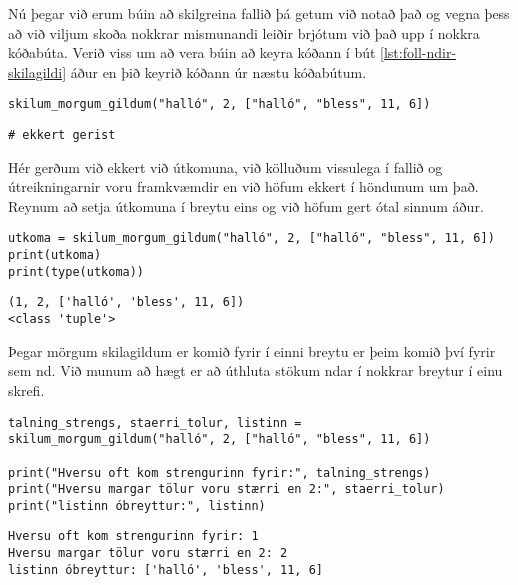 Nú þegar við erum búin að skilgreina fallið þá getum við notað það og vegna þess að við viljum skoða nokkrar mismunandi leiðir brjótum við það upp í nokkra kóðabúta.
Verið viss um að vera búin að keyra kóðann í bút \ref{lst:foll-ndir-skilagildi} áður en þið keyrið kóðann úr næstu kóðabútum.


\begin{lstlisting}[caption=Fallið úr kóðabút \ref{lst:foll-ndir-skilagildi} notað án þess að útkoman sé geymd, label=lst:foll-skil1]
skilum_morgum_gildum("halló", 2, ["halló", "bless", 11, 6])
\end{lstlisting}
\lstset{style=uttak}
\begin{lstlisting}
# ekkert gerist
\end{lstlisting}
\lstset{style=venjulegt}

Hér gerðum við ekkert við útkomuna, við kölluðum vissulega í fallið og útreikningarnir voru framkvæmdir en við höfum ekkert í höndunum um það.
Reynum að setja útkomuna í breytu eins og við höfum gert ótal sinnum áður.

\begin{lstlisting}[caption=Fallið úr kóðabút \ref{lst:foll-ndir-skilagildi} notað og útkoman geymd í einni breytu, label=lst:foll-skil2]
utkoma = skilum_morgum_gildum("halló", 2, ["halló", "bless", 11, 6])
print(utkoma)
print(type(utkoma))
\end{lstlisting}
\lstset{style=uttak}
\begin{lstlisting}
(1, 2, ['halló', 'bless', 11, 6])
<class 'tuple'>
\end{lstlisting}
\lstset{style=venjulegt}

Þegar mörgum skilagildum er komið fyrir í einni breytu er þeim komið því fyrir sem nd.
Við munum að hægt er að úthluta stökum ndar í nokkrar breytur í einu skrefi.

\begin{lstlisting}[caption=Fallið úr kóðabút \ref{lst:foll-ndir-skilagildi} notað og skilagildunum úthlutað í breytur rétt, label=lst:foll-skil3]
talning_strengs, staerri_tolur, listinn = skilum_morgum_gildum("halló", 2, ["halló", "bless", 11, 6])

print("Hversu oft kom strengurinn fyrir:", talning_strengs)
print("Hversu margar tölur voru stærri en 2:", staerri_tolur)
print("listinn óbreyttur:", listinn)
\end{lstlisting}
\lstset{style=uttak}
\begin{lstlisting}
Hversu oft kom strengurinn fyrir: 1
Hversu margar tölur voru stærri en 2: 2
listinn óbreyttur: ['halló', 'bless', 11, 6]
\end{lstlisting}
\lstset{style=venjulegt}

